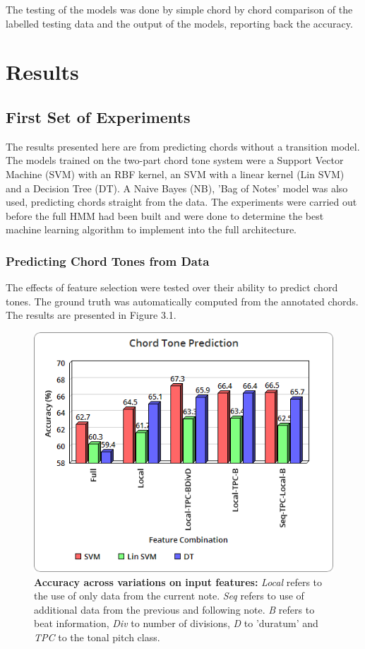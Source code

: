 \documentclass[bsc,singlespacing,parskip,deptreport,twoside,frontabs]{infthesis}
\begin{document}
The testing of the models was done by simple chord by chord comparison of the labelled testing data and the output of the models, reporting back the accuracy.

\chapter{Results}

\section{First Set of Experiments}

The results presented here are from predicting chords without a transition model. The models trained on the two-part chord tone system were a Support Vector Machine (SVM) with an RBF kernel, an SVM with a linear kernel (Lin SVM) and a Decision Tree (DT). A Naive Bayes (NB), 'Bag of Notes' model was also used, predicting chords straight from the data. The experiments were carried out before the full HMM had been built and were done to determine the best machine learning  algorithm to implement into the full architecture.

\subsection{Predicting Chord Tones from Data}

The effects of feature selection were tested over their ability to predict chord tones. The ground truth was automatically computed from the annotated chords. The results are presented in Figure 3.1. 

\begin{figure}
  \caption{\textbf{Accuracy across variations on input features:} \emph{Local} refers to the use of only data from the current note. \emph{Seq} refers to use of additional data from the previous and following note. \emph{B} refers to beat information, \emph{Div} to number of divisions, \emph{D} to 'duratum' and \emph{TPC} to the tonal pitch class.}
  \centering
    \includegraphics[scale=0.5]{ct1}
\end{figure}
\end{document}

